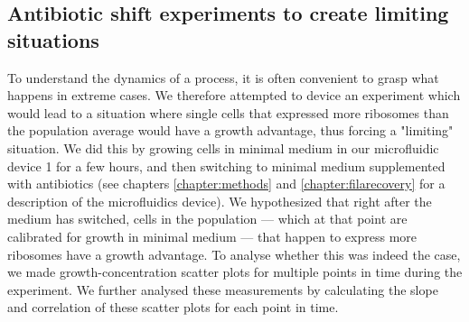 \subsection{Antibiotic shift experiments to create limiting situations}
\label{section:ribo:shiftexperiments}


To understand the dynamics of a process, it is often convenient to grasp what happens in extreme cases.
%
We therefore attempted to device an experiment which would lead to a situation where single cells that expressed more ribosomes than the population average would have a growth advantage, thus forcing a "limiting" situation.
% 
We did this by growing cells in minimal medium in our microfluidic device 1 for a few hours, and then switching to minimal medium supplemented with antibiotics (see chapters \ref{chapter:methods} and \ref{chapter:filarecovery} for a description of the microfluidics device).
%
We hypothesized that right after the medium has switched, cells in the population --- which at that point are calibrated for growth in minimal medium --- that happen to express more ribosomes have a growth advantage.
%
To analyse whether this was indeed the case, we made growth-concentration scatter plots for multiple points in time during the experiment.
%
We further analysed these measurements by calculating the slope and correlation of these scatter plots for each point in time.

